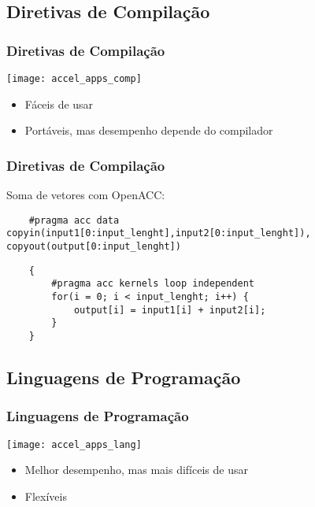 \documentclass[10pt, compress, aspectratio=43, xcolor={table,usenames,dvipsnames}]{beamer}
\begin{document}
\subsection{Diretivas de Compilação}

\begin{frame}
    \frametitle{Diretivas de Compilação}
    \begin{center}
        \texttt{[image: accel\_apps\_comp]}
    \end{center}

    \begin{itemize}
        \item Fáceis de usar
        \item Portáveis, mas desempenho depende do compilador
    \end{itemize}
\end{frame}

\begin{frame}[fragile]
    \frametitle{Diretivas de Compilação}
    Soma de vetores com \alert{OpenACC}:
    \begin{verbatim}
    #pragma acc data copyin(input1[0:input_lenght],input2[0:input_lenght]), copyout(output[0:input_lenght])
    \end{verbatim}

    \begin{verbatim}
    {
        #pragma acc kernels loop independent
        for(i = 0; i < input_lenght; i++) {
            output[i] = input1[i] + input2[i];
        }
    }
    \end{verbatim}
\end{frame}

\subsection{Linguagens de Programação}

\begin{frame}
    \frametitle{Linguagens de Programação}
    \begin{center}
        \texttt{[image: accel\_apps\_lang]}
    \end{center}

    \begin{itemize}
        \item Melhor desempenho, mas mais difíceis de usar
        \item Flexíveis
    \end{itemize}
\end{frame}
\end{document}
